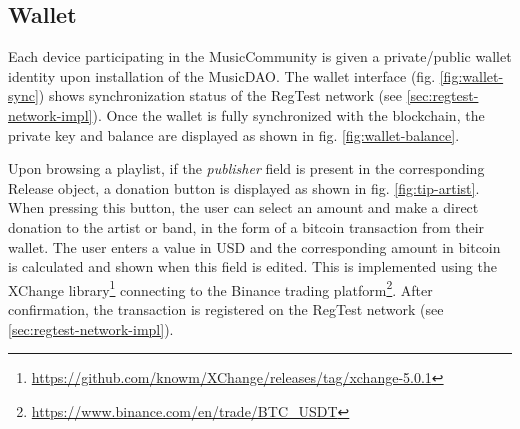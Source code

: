 \subsection{Wallet}
Each device participating in the MusicCommunity is given a private/public wallet identity upon installation of the MusicDAO. The wallet interface (fig. \ref{fig:wallet-sync}) shows synchronization status of the RegTest network (see \ref{sec:regtest-network-impl}). Once the wallet is fully synchronized with the blockchain, the private key and balance are displayed as shown in fig. \ref{fig:wallet-balance}. 

Upon browsing a playlist, if the \textit{publisher} field is present in the corresponding Release object, a donation button is displayed as shown in fig. \ref{fig:tip-artist}. When pressing this button, the user can select an amount and make a direct donation to the artist or band, in the form of a bitcoin transaction from their wallet. The user enters a value in USD and the corresponding amount in bitcoin is calculated and shown when this field is edited. This is implemented using the XChange library\footnote{\url{https://github.com/knowm/XChange/releases/tag/xchange-5.0.1}} connecting to the Binance trading platform\footnote{\url{https://www.binance.com/en/trade/BTC_USDT}}. After confirmation, the transaction is registered on the RegTest network (see \ref{sec:regtest-network-impl}). 
